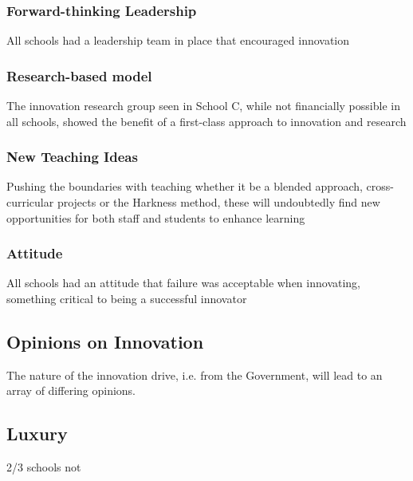 \subsubsection{Forward-thinking Leadership}
All schools had a leadership team in place that encouraged innovation 

\subsubsection{Research-based model}
The innovation research group seen in School C, while not financially possible in all schools, 
showed the benefit of a first-class approach to innovation and research

\subsubsection{New Teaching Ideas}
Pushing the boundaries with teaching whether it be a blended approach, cross-curricular projects or the Harkness method, these will undoubtedly find new opportunities for both staff and students to enhance learning 

\subsubsection{Attitude}
All schools had an attitude that failure was acceptable when innovating, something critical to being a successful innovator 

\subsection{Opinions on Innovation}

The nature of the innovation drive, i.e. from the Government, will lead to an array of differing opinions.

\subsection{Luxury}
2/3 schools not \cite{ADEC2016 pi.3}

